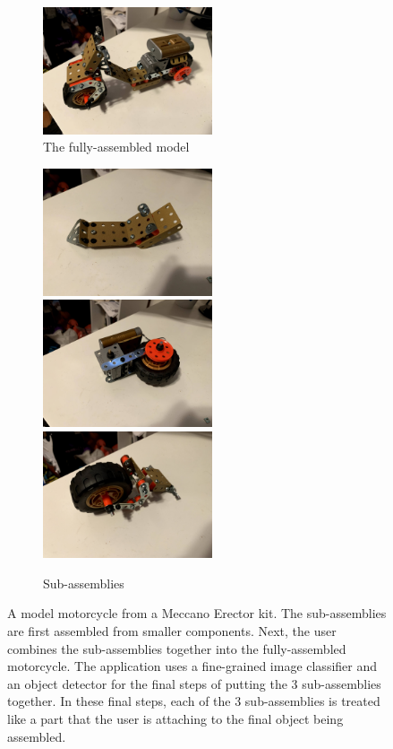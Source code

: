 \begin{figure}
  \begin{subfigure}{\textwidth}
    \includegraphics[width=5cm]{figures/erector/full.jpg}
    \caption{The fully-assembled model}
  \end{subfigure}
  \begin{subfigure}{\textwidth}
    \includegraphics[width=5cm]{figures/erector/sub1.jpg}
    \includegraphics[width=5cm]{figures/erector/sub2.jpg}
    \includegraphics[width=5cm]{figures/erector/sub3.jpg}
    \caption{Sub-assemblies}
  \end{subfigure}
  \caption{A model motorcycle from a Meccano Erector kit.
    The sub-assemblies are first assembled from smaller components.
    Next, the user combines the sub-assemblies together into the fully-assembled
    motorcycle.
    The application uses a fine-grained image classifier and an object detector
    for the final steps of putting the 3 sub-assemblies together.
    In these final steps, each of the 3 sub-assemblies is treated like a part
    that the user is attaching to the final object being assembled.
  }\label{fig:erector}
\end{figure}

